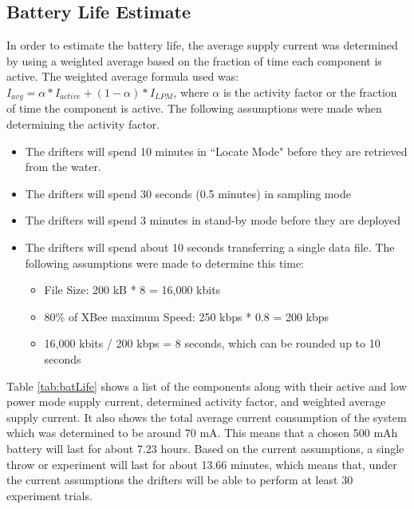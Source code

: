 \subsection{Battery Life Estimate}
In order to estimate the battery life, the average supply current was determined by using a weighted average based on the fraction of time each component is active.  The weighted average formula used was: $I_{avg} = \alpha * I_{active} + (1 - \alpha) * I_{LPM}$, where $\alpha$ is the activity factor or the fraction of time the component is active.  The following assumptions were made when determining the activity factor.

\begin{itemize}
\item The drifters will spend 10 minutes in ``Locate Mode" before they are retrieved from the water.
\item The drifters will spend 30 seconds (0.5 minutes) in sampling mode
\item The drifters will spend 3 minutes in stand-by mode before they are deployed
\item The drifters will spend about 10 seconds transferring a single data file.  The following assumptions were made to determine this time:
	\begin{itemize}
		\item File Size: 200 kB * 8 = 16,000 kbits
		\item 80\% of XBee maximum Speed: 250 kbps * 0.8 = 200 kbps
		\item 16,000 kbits / 200 kbps = 8 seconds, which can be rounded up to 10 seconds
	\end{itemize}
\end{itemize}


Table \ref{tab:batLife} shows a list of the components along with their active and low power mode supply current, determined activity factor, and weighted average supply current.  It also shows the total average current consumption of the system which was determined to be  around 70 mA.  This means that a chosen 500 mAh battery will last for about 7.23 hours.  Based on the current assumptions, a single throw or experiment will last for about 13.66 minutes, which means that, under the current assumptions the drifters will be able to perform at least 30 experiment trials.

